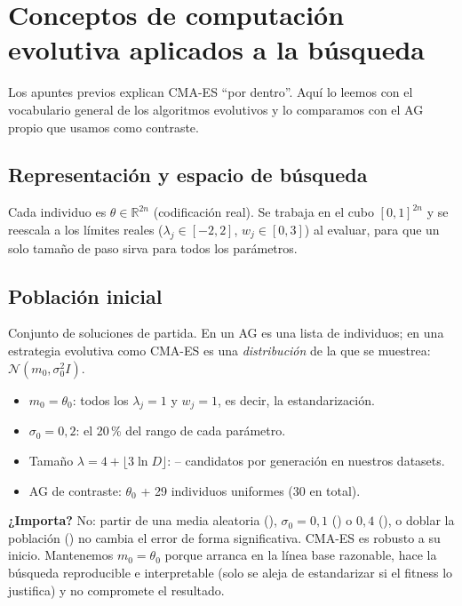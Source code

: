 \documentclass[apuntes]{uc3mmaster}
\begin{document}
\section{Conceptos de computación evolutiva aplicados a la búsqueda}\label{sec:evolutiva}
Los apuntes previos explican CMA-ES ``por dentro''. Aquí lo leemos con el vocabulario general de los algoritmos
evolutivos y lo comparamos con el AG propio que usamos como contraste.

\subsection{Representación y espacio de búsqueda}
Cada individuo es $\theta\in\mathbb R^{2n}$ (codificación real). Se trabaja en el cubo $[0,1]^{2n}$ y se reescala a
los límites reales ($\lambda_j\in[-2,2]$, $w_j\in[0,3]$) al evaluar, para que un solo tamaño de paso sirva para todos
los parámetros.

\subsection{Población inicial}
\begin{definicion}
Conjunto de soluciones de partida. En un AG es una lista de individuos; en una estrategia evolutiva como CMA-ES es
una \emph{distribución} de la que se muestrea: $\mathcal N(m_0,\sigma_0^2I)$.
\end{definicion}
\begin{itemize}
\item $m_0=\theta_0$: todos los $\lambda_j=1$ y $w_j=1$, es decir, la estandarización.
\item $\sigma_0=0{,}2$: el 20\,\% del rango de cada parámetro.
\item Tamaño $\lambda=4+\lfloor3\ln D\rfloor$: \popMin--\popMax{} candidatos por generación en nuestros datasets.
\item AG de contraste: $\theta_0$ + 29 individuos uniformes (30 en total).
\end{itemize}
\textbf{¿Importa?} No: partir de una media aleatoria (\ctrlIniAleat), $\sigma_0=0{,}1$ (\ctrlSigmaBajo) o $0{,}4$
(\ctrlSigmaAlto), o doblar la población (\ctrlPobDoble) no cambia el error de forma significativa. CMA-ES es robusto
a su inicio. Mantenemos $m_0=\theta_0$ porque arranca en la línea base razonable, hace la búsqueda reproducible e
interpretable (solo se aleja de estandarizar si el fitness lo justifica) y no compromete el resultado.
\end{document}

